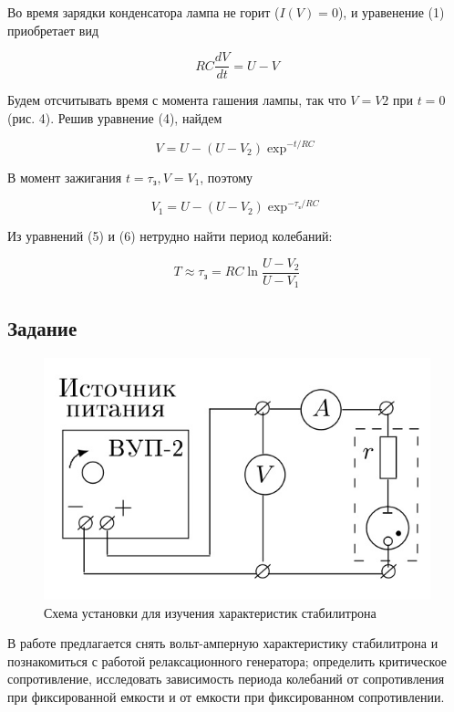 \documentclass[a4paper, 12pt]{article}
\newcommand{\mysec}[1]{\begin{center}\section*{#1}\end{center}}
\begin{document}
    Во время зарядки конденсатора лампа не горит ($I\left(V\right) = 0$), и уравенение (1) приобретает вид

    \begin{equation}
        R C \dfrac{dV}{dt} = U - V
    \end{equation}

    Будем отсчитывать время с момента гашения лампы, так что $V = V2$ при $t = 0$ (рис. 4).
    Решив уравнение (4), найдем

    \begin{equation}
        V = U - \left(U - V_2\right)\exp^{-t/RC}
    \end{equation}

    В момент зажигания $t = \tau_з, V = V_1$, поэтому

    \begin{equation}
        V_1 = U - \left(U - V_2\right)\exp^{-\tau_з/RC}
    \end{equation}

    Из уравнений (5) и (6) нетрудно найти период колебаний:

    \begin{equation}
        T \approx \tau_з = R C \ln{\dfrac{U - V_2}{U - V_1}}
    \end{equation}

    \mysec{Задание}
    
    \begin{figure}
        \includegraphics[scale=0.3]{pic5.jpg}
        \caption{Схема установки для изучения характеристик стабилитрона}
    \end{figure}
    В работе предлагается снять вольт-амперную характеристику стабилитрона и познакомиться с работой релаксационного генератора; определить критическое сопротивление, исследовать зависимость периода колебаний от сопротивления при фиксированной емкости и от емкости при фиксированном сопротивлении.\\\\\\\\\\\\
\end{document}
